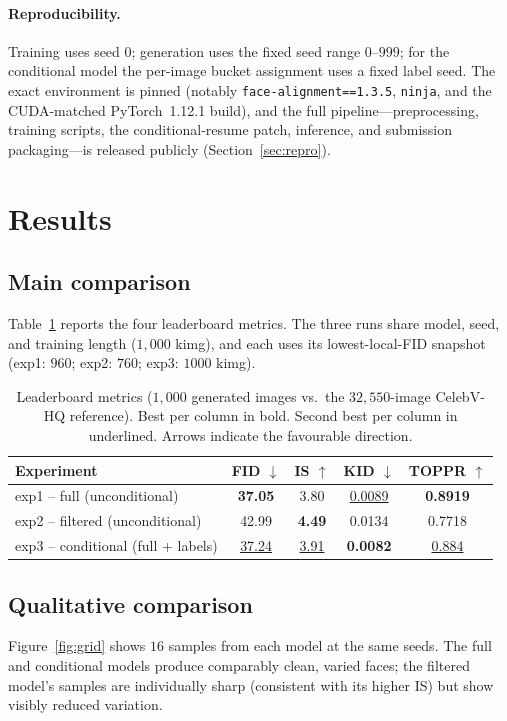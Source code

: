 \documentclass{article}
\begin{document}
\paragraph{Reproducibility.}
Training uses seed $0$; generation uses the fixed seed range $0$--$999$; for the
conditional model the per-image bucket assignment uses a fixed label seed. The
exact environment is pinned (notably \texttt{face-alignment==1.3.5},
\texttt{ninja}, and the CUDA-matched PyTorch~1.12.1 build), and the full
pipeline---preprocessing, training scripts, the conditional-resume patch,
inference, and submission packaging---is released publicly
(Section~\ref{sec:repro}).

\section{Results}
\subsection{Main comparison}
Table~\ref{tab:main} reports the four leaderboard metrics. The three runs share
model, seed, and training length ($1{,}000$ kimg), and each uses its
lowest-local-FID snapshot (exp1: $960$; exp2: $760$; exp3: $1000$ kimg).

\begin{table}[h]
\centering
\caption{Leaderboard metrics ($1{,}000$ generated images vs.\ the
$32{,}550$-image CelebV-HQ reference). Best per column in bold. Second best per column in underlined. 
Arrows indicate the favourable direction.}
\label{tab:main}
\begin{tabular}{lcccc}
\toprule
Experiment & FID $\downarrow$ & IS $\uparrow$ & KID $\downarrow$ & TOPPR $\uparrow$ \\
\midrule
exp1 -- full (unconditional)        & \textbf{37.05} & 3.80 & \underline{0.0089} & \textbf{0.8919} \\
exp2 -- filtered (unconditional)    & 42.99 & \textbf{4.49} & 0.0134 & 0.7718 \\
exp3 -- conditional (full + labels) & \underline{37.24} & \underline{3.91} & \textbf{0.0082} & \underline{0.884} \\
\bottomrule
\end{tabular}
\end{table}


\subsection{Qualitative comparison}
Figure~\ref{fig:grid} shows $16$ samples from each model at the same seeds. The
full and conditional models produce comparably clean, varied faces; the filtered
model's samples are individually sharp (consistent with its higher IS) but show
visibly reduced variation.
\end{document}

